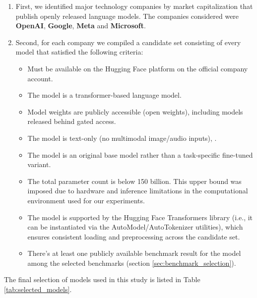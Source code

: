 \begin{enumerate}
    \item First, we identified major technology companies by market capitalization that publish openly released language models. The companies considered were \textbf{OpenAI}, \textbf{Google}, \textbf{Meta} and \textbf{Microsoft}.
    \item Second, for each company we compiled a candidate set consisting of every model that satisfied the following criteria:
    
        \begin{itemize}
            \item Must be available on the Hugging Face platform on the official company account.
            \item The model is a transformer-based language model.
            \item Model weights are publicly accessible (open weights), including models released behind
            gated access.
            \item The model is text-only (no multimodal image/audio inputs), .
            \item The model is an original base model rather than a task-specific fine-tuned variant.
            \item The total parameter count is below 150 billion. This upper bound was imposed due to
            hardware and inference limitations in the computational environment used for our experiments.
            \item The model is supported by the Hugging Face Transformers library \cite{Wolf2019} (i.e., it can be
            instantiated via the AutoModel/AutoTokenizer utilities), which ensures consistent loading and
            preprocessing across the candidate set.
            \item There's at least one publicly available benchmark result for the model among the selected benchmarks (section \ref{sec:benchmark_selection}).
        \end{itemize}

\end{enumerate}

The final selection of models used in this study is listed in Table \ref{tab:selected_models}.

